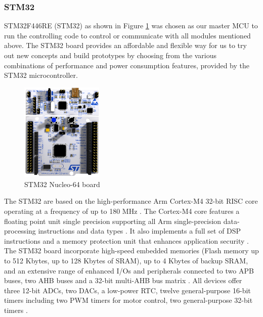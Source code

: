 \documentclass[12pt, a4paper, oneside]{report}
\begin{document}
\subsubsection{STM32}
STM32F446RE (STM32) as shown in Figure \ref{fig:mt5} was chosen as our master MCU to run the controlling code to control or communicate with all modules mentioned above. The STM32 board provides an affordable and flexible way for us to try out new concepts and build prototypes by choosing from the various combinations of performance and power consumption features, provided by the STM32 microcontroller.

\begin{figure}[H]
  \centering
  \includegraphics[width=0.35\textwidth]{pic/Motor Drive/15.png}
  \caption{STM32 Nucleo-64 board \cite{zzs3}}
  \label{fig:mt5}
\end{figure}

The STM32 are based on the high-performance Arm Cortex-M4 32-bit RISC core operating at a frequency of up to 180 MHz \cite{zzs3}. The Cortex-M4 core features a floating point unit single precision supporting all Arm single-precision data-processing instructions and data types \cite{zzs3}. It also implements a full set of DSP instructions and a memory protection unit that enhances application security \cite{zzs3}. The STM32 board incorporate high-speed embedded memories (Flash memory up to 512 Kbytes, up to 128 Kbytes of SRAM), up to 4 Kbytes of backup SRAM, and an extensive range of enhanced I/Os and peripherals connected to two APB buses, two AHB buses and a 32-bit multi-AHB bus matrix \cite{zzs3}. All devices offer three 12-bit ADCs, two DACs, a low-power RTC, twelve general-purpose 16-bit timers including two PWM timers for motor control, two general-purpose 32-bit timers \cite{zzs3}.
\end{document}
